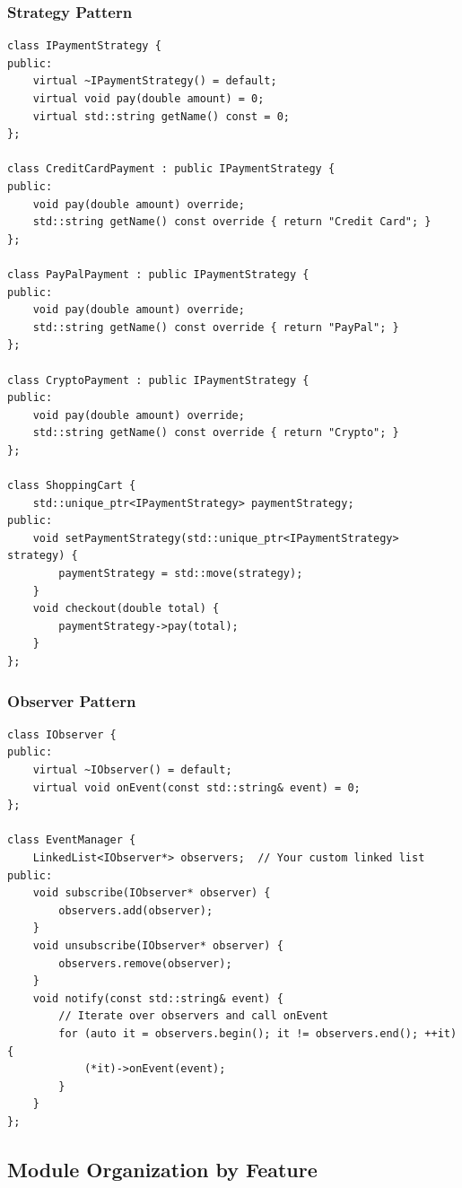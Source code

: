 \subsubsection{Strategy Pattern}

\begin{lstlisting}[style=cpp]
class IPaymentStrategy {
public:
    virtual ~IPaymentStrategy() = default;
    virtual void pay(double amount) = 0;
    virtual std::string getName() const = 0;
};

class CreditCardPayment : public IPaymentStrategy {
public:
    void pay(double amount) override;
    std::string getName() const override { return "Credit Card"; }
};

class PayPalPayment : public IPaymentStrategy {
public:
    void pay(double amount) override;
    std::string getName() const override { return "PayPal"; }
};

class CryptoPayment : public IPaymentStrategy {
public:
    void pay(double amount) override;
    std::string getName() const override { return "Crypto"; }
};

class ShoppingCart {
    std::unique_ptr<IPaymentStrategy> paymentStrategy;
public:
    void setPaymentStrategy(std::unique_ptr<IPaymentStrategy> strategy) {
        paymentStrategy = std::move(strategy);
    }
    void checkout(double total) {
        paymentStrategy->pay(total);
    }
};
\end{lstlisting}

\subsubsection{Observer Pattern}

\begin{lstlisting}[style=cpp]
class IObserver {
public:
    virtual ~IObserver() = default;
    virtual void onEvent(const std::string& event) = 0;
};

class EventManager {
    LinkedList<IObserver*> observers;  // Your custom linked list
public:
    void subscribe(IObserver* observer) {
        observers.add(observer);
    }
    void unsubscribe(IObserver* observer) {
        observers.remove(observer);
    }
    void notify(const std::string& event) {
        // Iterate over observers and call onEvent
        for (auto it = observers.begin(); it != observers.end(); ++it) {
            (*it)->onEvent(event);
        }
    }
};
\end{lstlisting}

\subsection{Module Organization by Feature}

